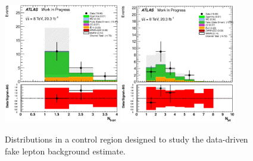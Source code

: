 \begin{figure}[h!]
\includegraphics[width=0.45\textwidth]{figures/Fake_CR/NBTaggedJets_histratio.eps}
\includegraphics[width=0.45\textwidth]{figures/Fake_CR/NJets_histratio.eps}
\caption{Distributions in a control region designed to study the data-driven 
fake lepton background estimate.  }
\label{fig:FakeCR}
\end{figure}






%

